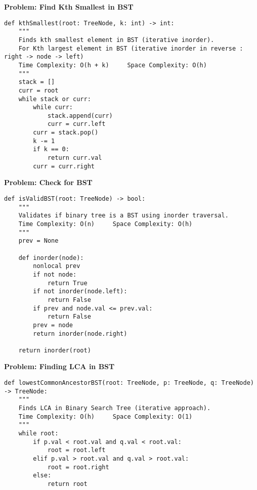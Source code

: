 \noindent\textbf{Problem: Find Kth Smallest in BST}
\begin{verbatim}
def kthSmallest(root: TreeNode, k: int) -> int:
    """
    Finds kth smallest element in BST (iterative inorder).
    For Kth largest element in BST (iterative inorder in reverse : right -> node -> left)
    Time Complexity: O(h + k)     Space Complexity: O(h)
    """
    stack = []
    curr = root
    while stack or curr:
        while curr:
            stack.append(curr)
            curr = curr.left
        curr = stack.pop()
        k -= 1
        if k == 0:
            return curr.val
        curr = curr.right
\end{verbatim}
\noindent\textbf{Problem: Check for BST}
\begin{verbatim}
def isValidBST(root: TreeNode) -> bool:
    """
    Validates if binary tree is a BST using inorder traversal.
    Time Complexity: O(n)     Space Complexity: O(h)
    """
    prev = None
    
    def inorder(node):
        nonlocal prev
        if not node:
            return True
        if not inorder(node.left):
            return False
        if prev and node.val <= prev.val:
            return False
        prev = node
        return inorder(node.right)
    
    return inorder(root)
\end{verbatim}
\noindent\textbf{Problem: Finding LCA in BST}
\begin{verbatim}
def lowestCommonAncestorBST(root: TreeNode, p: TreeNode, q: TreeNode) -> TreeNode:
    """
    Finds LCA in Binary Search Tree (iterative approach).
    Time Complexity: O(h)     Space Complexity: O(1)
    """
    while root:
        if p.val < root.val and q.val < root.val:
            root = root.left
        elif p.val > root.val and q.val > root.val:
            root = root.right
        else:
            return root
\end{verbatim}

